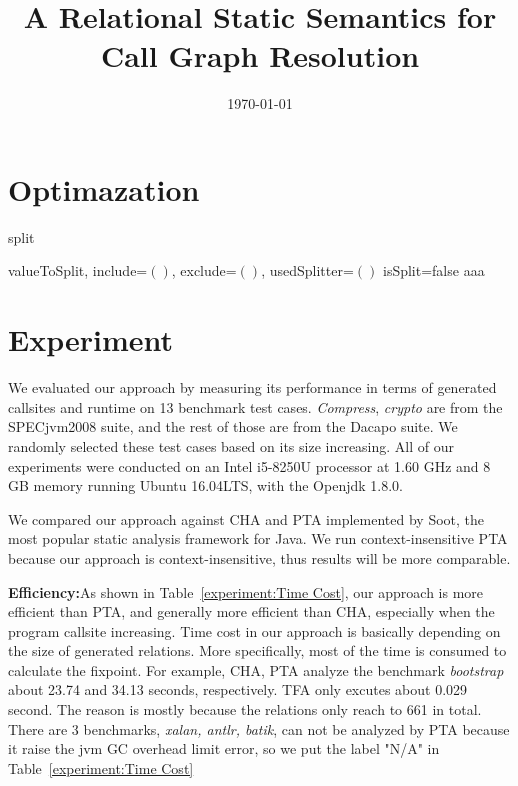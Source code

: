 \documentclass{llncs}
\title{A Relational Static Semantics for Call Graph Resolution}
\author{\today}
\institute{Jinan University}
\begin{document}
\maketitle


\section{Optimazation}\label{sec:optimazation}
\begin{algorithm}
\caption{split}
\label{alg:split}
\begin{algorithmic}
\REQUIRE valueToSplit, include=$()$, exclude=$()$, usedSplitter=$()$
\STATE isSplit=false
	\STATE aaa
\ENDWHILE

\end{algorithmic}
\end{algorithm}

\section{Experiment}\label{sec:experiment}
We evaluated our approach by measuring its performance in terms of generated callsites and runtime on 13 benchmark test cases. \textit{Compress}, \textit{crypto} are from the SPECjvm2008 suite, and the rest of those are from the Dacapo suite. We randomly selected these test cases based on its size increasing.
All of our experiments were conducted on an Intel i5-8250U processor at 1.60 GHz and 8 GB memory running Ubuntu 16.04LTS, with the Openjdk 1.8.0.

We compared our approach against CHA and PTA implemented by Soot, the most popular static analysis framework for Java. We run context-insensitive PTA because our approach is context-insensitive, thus results will be more comparable.

\textbf{Efficiency:}As shown in Table~\ref{experiment:Time Cost}, our approach is more efficient than PTA, and generally more efficient than CHA, especially when the program callsite increasing. Time cost in our approach is basically depending on the size of generated relations. More specifically, most of the time is consumed to calculate the fixpoint. For example, CHA, PTA analyze the benchmark \textit{bootstrap} about 23.74 and 34.13 seconds, respectively. TFA only excutes about 0.029 second. The reason is mostly because the relations only reach to 661 in total. There are 3 benchmarks, \textit{xalan, antlr, batik}, can not be analyzed by PTA because it raise the jvm GC overhead limit error, so we put the label "N/A" in Table~\ref{experiment:Time Cost}
\end{document}
